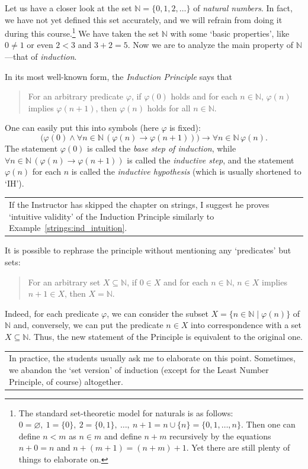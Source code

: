 \documentclass[12pt,notitlepage]{article}
\theoremstyle{plain}
\theoremstyle{definition}
\theoremstyle{plain}
\newcommand{\N}{\mathbb{N}}
\newcommand{\sbs}{\subseteq}
\newcommand{\void}{\varnothing}
\renewcommand{\phi}{\varphi}
\newcommand{\1}{\mathbf{1}}
\newcommand{\0}{\mathbf{0}}
\newcommand{\mcomm}[1]{
\medskip\noindent\begin{tabular}{| l}
\parbox{0.99\textwidth}{{\small
#1 }}\end{tabular}
\smallskip}
\begin{document}
Let us have a closer look at the set $\N = \{0, 1, 2,\ldots \}$ of \emph{natural numbers}. In fact, we have not yet defined this set accurately, and we will refrain from doing it during this course.\footnote{The standard set-theoretic model for naturals is as follows: $0 = \void,\ 1 = \{0\},\ 2 = \{ 0, 1 \},\ \ldots,\ n + 1 = n \cup \{ n\} = \{0,1,\ldots, n \}$. Then one can define $n < m$ as $n \in m$ and define $n + m$ recursively by the equations $n + 0 = n$ and $n + (m + 1) = (n + m) + 1$. Yet there are still plenty of things to elaborate on.} We have taken the set $\N$ with some `basic properties', like $0 \neq 1$ or even $2 < 3$ and $3 + 2 = 5$. Now we are to analyze the main property of $\N$---that of \emph{induction}.

In its most well-known form, the \emph{Induction Principle} says that
\begin{quote}
For an arbitrary predicate $\phi$, if $\phi(0)$ holds and for each $n \in \N$, $\phi(n)$ implies $\phi(n+1)$, then $\phi(n)$ holds for all $n \in \N$.
\end{quote}
One can easily put this into symbols (here $\phi$ is fixed):
$$\bigl(\phi(0) \wedge \forall n\in \N \, (\phi(n) \to \phi(n+1))\bigr) \to \forall n \in \N\, \phi(n).$$
The statement $\phi(0)$ is called the \emph{base step of induction}, while $\forall n \in \N\, (\phi(n) \to \phi(n+1))$ is called the \emph{inductive step}, and the statement $\phi(n)$ for each $n$ is called the \emph{inductive hypothesis} (which is usually shortened to `IH').

\mcomm{If the Instructor has skipped the chapter on strings, I suggest he proves `intuitive validity' of the Induction Principle similarly to Example~\ref{strings:ind_intuition}.}

\noindent It is possible to rephrase the principle without mentioning any `predicates' but sets:
\begin{quote}
For an arbitrary set $X \sbs \N$, if $0 \in X$ and for each $n \in \N$, $n \in X$ implies $n+1 \in X$, then $X = \N$.
\end{quote}
Indeed, for each predicate $\phi$, we can consider the subset $X = \{ n \in \N \mid \phi(n) \}$ of $\N$ and, conversely, we can put the predicate $n \in X$ into correspondence with a set $X \sbs \N$. Thus, the new statement of the Principle is equivalent to the original one.

\mcomm{In practice, the students usually ask me to elaborate on this point. Sometimes, we abandon the `set version' of induction (except for the Least Number Principle, of course) altogether.}
\end{document}
